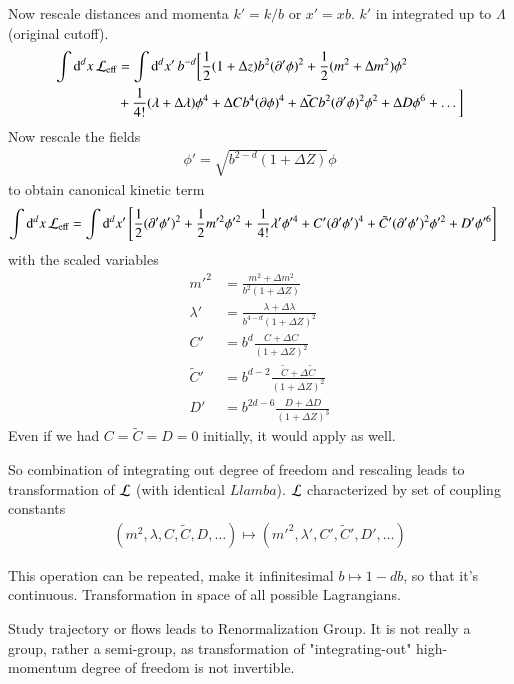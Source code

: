 Now rescale distances and momenta $k' = k / b$ or $x' = xb$. $k'$ in integrated up to $\Lambda$ (original cutoff).
\begin{align*}
   \int \dd[d]{x} \mathcal{L}_{\text{eff}} &= \int \dd[d]{x'} b^{-d} \bigg[ \frac{1}{2} (1+\Delta z) b^2 (\partial' \phi)^2 + \frac{1}{2} (m^2 + \Delta m^2)\phi^2 \\
      &+ \frac{1}{4!} (\lambda + \Delta \lambda) \phi^4 + \Delta C b^4 (\partial \phi)^4 + \tilde{\Delta C}b^2 (\partial' \phi)^2 \phi^2 + \Delta D \phi^6 + \dots \bigg]
\end{align*}
Now rescale the fields  
\begin{align*}
  \phi' = \sqrt{b^{2-d} (1+ \Delta Z)} \phi 
\end{align*}
to obtain canonical kinetic term
\begin{align*}
      \int \dd[d]{x} \mathcal{L}_{\text{eff}} &= \int \dd[d]{x'} \left[ \frac{1}{2} (\partial' \phi')^2 + \frac{1}{2} m'^2 \phi'^2 + \frac{1}{4!} \lambda' \phi'^4 + C' (\partial' \phi')^4 + \tilde{C}' (\partial' \phi')^2 \phi'^2 + D' \phi'^6 \right]
\end{align*}
with the scaled variables
\begin{align*}
   m'^2 &= \frac{m^2 + \Delta m^2}{b^2(1+\Delta Z)} \\
   \lambda' &= \frac{\lambda + \Delta \lambda}{b^{4-d} (1+ \Delta Z)^2} \\
   C' &= b^d \frac{C+ \Delta C}{(1+\Delta Z)^2} \\
   \tilde{C}' &= b^{d-2} \frac{\tilde{C} + \Delta \tilde{C}}{(1+\Delta Z)^2} \\
   D' &= b^{2d-6} \frac{D+ \Delta D}{(1+\Delta Z)^3}
\end{align*}
Even if we had $C = \tilde{C} = D = 0$ initially, it would apply as well.

So combination of integrating out degree of freedom and rescaling leads to transformation of $\mathcal{L}$ (with identical $Llamba$). $\mathcal{L}$ characterized by set of coupling constants 
\begin{align*}
  (m^2, \lambda, C, \tilde{C}, D, \dots) \mapsto (m'^2, \lambda', C', \tilde{C}', D', \dots) 
\end{align*}

This operation can be repeated, make it infinitesimal $ b \mapsto 1 - db$, so that it's continuous. Transformation in space of all possible Lagrangians.

Study trajectory or flows leads to Renormalization Group. It is not really a group, rather a semi-group, as transformation of "integrating-out" high-momentum degree of freedom is not invertible.

